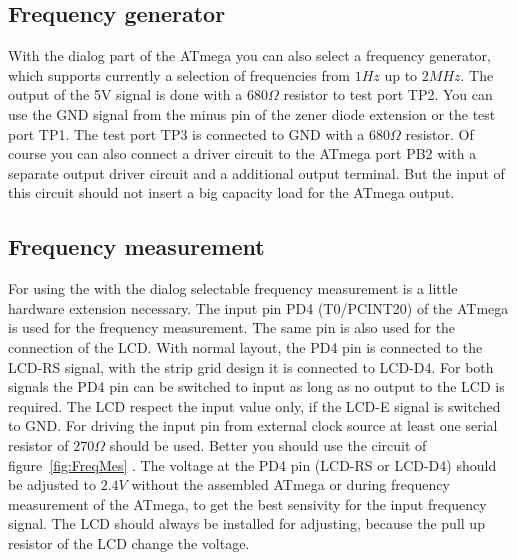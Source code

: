 \subsection{Frequency generator}

With the dialog part of the ATmega you can also select a frequency generator, which supports
currently a selection of frequencies from \(1 Hz\) up to \(2 MHz\).
The output of the 5V signal is done with a \(680\Omega\) resistor to test port TP2.
You can use the GND signal from the minus pin of the zener diode extension or the test port TP1.
The test port TP3 is connected to GND with a \(680\Omega\) resistor.
Of course you can also connect a driver circuit to the ATmega port PB2 with a separate output
driver circuit and a additional output terminal. But the input of this circuit should not insert a
big capacity load for the ATmega output.

\subsection{Frequency measurement}
\label{sec:frequency_counter}

For using the with the dialog selectable frequency measurement is a little hardware extension
necessary. The input pin PD4 (T0/PCINT20) of the ATmega is used for the frequency measurement.
The same pin is also used for the connection of the LCD. With normal layout, the PD4 pin is connected
to the LCD-RS signal, with the strip grid design it is connected to LCD-D4.
For both signals the PD4 pin can be switched to input as long as no output to the LCD is
required. The LCD respect the input value only, if the LCD-E signal is switched to GND.
For driving the input pin from external clock source at least one serial resistor of \(270\Omega\) should be used.
Better you should use the circuit of figure~\ref{fig:FreqMes} .
The voltage at the PD4 pin (LCD-RS or LCD-D4) should be adjusted to \(2.4V\) without the assembled ATmega
or during frequency measurement of the ATmega, to get the best sensivity for the input frequency signal.
The LCD should always be installed for adjusting, because the pull up resistor of the LCD change the voltage.

